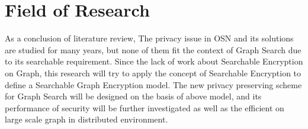 \section{Field of Research}
As a conclusion of literature review, The privacy issue in OSN and its solutions are studied for many years, but none of them fit the context of Graph Search due to its searchable requirement. Since the lack of work about Searchable Encryption on Graph, this research will try to apply the concept of Searchable Encryption to define a Searchable Graph Encryption model. The new privacy preserving scheme for Graph Search will be designed on the basis of above model, and its performance of security will be further investigated as well as the efficient on large scale graph in distributed environment.
















